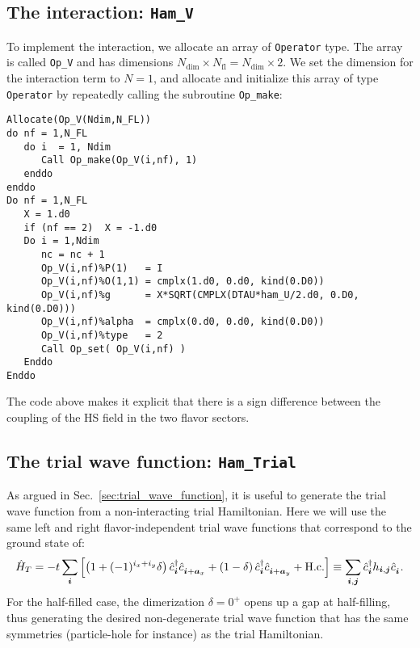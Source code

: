 \subsection{The interaction: \texttt{Ham\_V}}\label{U_PV_Ham_V} 
To implement  the interaction, we allocate an array of \texttt{Operator} type. The array is called  \texttt{Op\_V} and has dimensions $N_{\mathrm{dim}}\times N_{\mathrm{fl}}=N_{\mathrm{dim}} \times 2$. 
We set the dimension for the interaction term to  $N=1$, and  allocate and initialize this array of type  \texttt{Operator} by repeatedly calling the subroutine \texttt{Op\_make}: 

\begin{lstlisting}[style=fortran]
Allocate(Op_V(Ndim,N_FL))
do nf = 1,N_FL
   do i  = 1, Ndim
      Call Op_make(Op_V(i,nf), 1)
   enddo
enddo
Do nf = 1,N_FL
   X = 1.d0
   if (nf == 2)  X = -1.d0
   Do i = 1,Ndim
      nc = nc + 1
      Op_V(i,nf)%P(1)   = I
      Op_V(i,nf)%O(1,1) = cmplx(1.d0, 0.d0, kind(0.D0))
      Op_V(i,nf)%g      = X*SQRT(CMPLX(DTAU*ham_U/2.d0, 0.D0, kind(0.D0))) 
      Op_V(i,nf)%alpha  = cmplx(0.d0, 0.d0, kind(0.D0))
      Op_V(i,nf)%type   = 2
      Call Op_set( Op_V(i,nf) )
   Enddo
Enddo
\end{lstlisting}
The code above makes it explicit that there is a sign difference between the coupling of the HS field in the two flavor sectors. 

\subsection{The trial wave function: \texttt{Ham\_Trial}} \label{U_PV_Ham_Trial}
\label{Sec:Plain_vanilla_trial}
As  argued in Sec.~\ref{sec:trial_wave_function}, it is useful to generate the trial wave function from a non-interacting trial Hamiltonian.   Here we will  use the same left and right  flavor-independent trial wave functions that correspond to the ground state of: 
\begin{equation}
   \hat{H}_T    = - t \sum_{\ve{i}} \left[  \left( 1 + (-1)^{i_x + i_y}  \delta \right)  \hat{c}^{\dagger}_{\ve{i}}   \hat{c}^{\phantom\dagger}_{\ve{i} +\ve{a}_x}  +  
   							\left(1 - \delta \right)  \hat{c}^{\dagger}_{\ve{i}}   \hat{c}^{\phantom\dagger}_{\ve{i} +\ve{a}_y}    + \hc  \right]   \equiv   \sum_{\ve{i},\ve{j}}  \hat{c}^{\dagger}_{\ve{i}}   h_{\ve{i},\ve{j}}  \hat{c}^{\phantom\dagger}_{\ve{i}}.
\end{equation}
For the half-filled case, the  dimerization $\delta  = 0^{+} $  opens up a gap at  half-filling,   thus generating the desired  non-degenerate  trial wave function  that has the same symmetries (particle-hole  for instance) as  the   trial  Hamiltonian.

